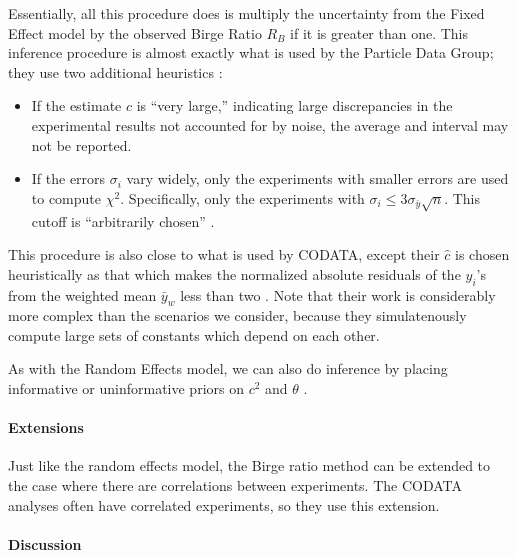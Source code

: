 \documentclass[letterpaper,12pt]{article}
\begin{document}
Essentially, all this procedure does is multiply the uncertainty from the Fixed Effect model by the observed Birge Ratio $R_B$ if it is greater than one. This inference procedure is almost exactly what is used by the Particle Data Group; they use two additional heuristics \citep[Section 5.2.2]{navas2024review}:

\begin{itemize}

\item
  If the estimate $\hat c$ is ``very large,'' indicating large discrepancies in the experimental results not accounted for by noise, the average and interval may not be reported.
\item
  If the errors $\sigma_i$ vary widely, only the experiments with smaller errors are used to compute $\chi^2$. Specifically, only the experiments with $\sigma_i\leq 3\sigma_{\bar y}\sqrt{n}$. This cutoff is ``arbitrarily chosen'' \citep[Section 5.2.2]{navas2024review}.
\end{itemize}

This procedure is also close to what is used by CODATA, except their $\hat c$ is chosen heuristically as that which makes the normalized absolute residuals of the $y_i$'s from the weighted mean $\bar y_w$ less than two \citep{tiesinga2021codata}. Note that their work is considerably more complex than the scenarios we consider, because they simulatenously compute large sets of constants which depend on each other.

As with the Random Effects model, we can also do inference by placing informative or uninformative priors on $c^2$ and $\theta$ \citep{bodnar2014adjustment}.

\paragraph{Extensions}\label{extensions-1}

Just like the random effects model, the Birge ratio method can be extended to the case where there are correlations between experiments. The CODATA analyses often have correlated experiments, so they use this extension.

\paragraph{Discussion}\label{discussion}
\end{document}

